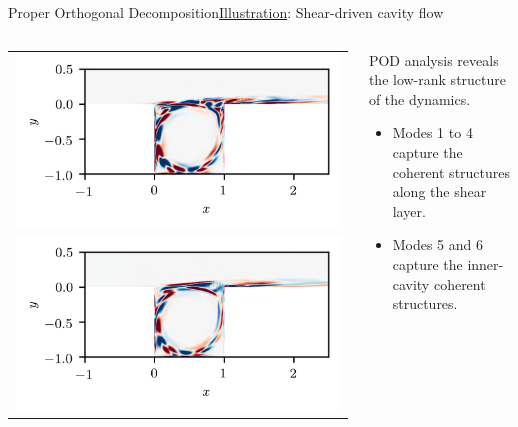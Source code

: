 \documentclass[usenames,dvipsnames,svgnames,10pt,aspectratio=169]{beamer}
\begin{document}
\begin{frame}[t, c]{Proper Orthogonal Decomposition}{\underline{Illustration}: Shear-driven cavity flow}
	\begin{columns}
		\begin{column}{.5\textwidth}
			\centering
			\begin{tabular}{c}
				\includegraphics[width=.8\textwidth]{PCA_mode_4} \\
				\includegraphics[width=.8\textwidth]{PCA_mode_5}
			\end{tabular}
		\end{column}
		\begin{column}{.5\textwidth}
			POD analysis reveals the low-rank structure of the dynamics.
			\medskip
			\begin{itemize}
				\item Modes 1 to 4 capture the coherent structures along the shear layer.
				\medskip
				\item Modes 5 and 6 capture the inner-cavity coherent structures.
			\end{itemize}
			\vspace{1cm}
		\end{column}
	\end{columns}
\end{frame}
\end{document}
